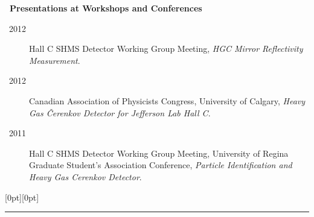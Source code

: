 \documentclass[a4paper,12pt]{letter}
\begin{document}
\textbf{\normalsize ~Presentations at Workshops and Conferences } \parab
\begin{description}
\item[~2012] \textrm{\normalsize Hall C SHMS Detector Working Group Meeting, \emph{HGC Mirror Reflectivity Measurement}. }
\item[~2012] \textrm{\normalsize Canadian Association of Physicists Congress, University of Calgary, \emph{Heavy Gas \v{C}erenkov Detector for Jefferson Lab Hall C}. }
\item[~2011] \textrm{\normalsize Hall C SHMS Detector Working Group Meeting, University of Regina Graduate Student's Association Conference, \emph{Particle Identification and Heavy Gas Cerenkov Detector}.}
\end{description}



\secb


\raisebox{0pt}[0pt][0pt]{\Large\textbf{\raisebox{-3.5ex}{Computing Skill}}}
\\[2mm]
\rule[-0.5cm]{10cm}{1pt}
\end{document}

